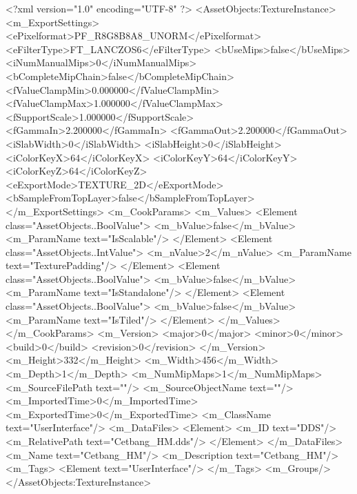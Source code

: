 <?xml version="1.0" encoding="UTF-8" ?>
<AssetObjects:TextureInstance>
    <m_ExportSettings>
        <ePixelformat>PF_R8G8B8A8_UNORM</ePixelformat>
        <eFilterType>FT_LANCZOS6</eFilterType>
        <bUseMips>false</bUseMips>
        <iNumManualMips>0</iNumManualMips>
        <bCompleteMipChain>false</bCompleteMipChain>
        <fValueClampMin>0.000000</fValueClampMin>
        <fValueClampMax>1.000000</fValueClampMax>
        <fSupportScale>1.000000</fSupportScale>
        <fGammaIn>2.200000</fGammaIn>
        <fGammaOut>2.200000</fGammaOut>
        <iSlabWidth>0</iSlabWidth>
        <iSlabHeight>0</iSlabHeight>
        <iColorKeyX>64</iColorKeyX>
        <iColorKeyY>64</iColorKeyY>
        <iColorKeyZ>64</iColorKeyZ>
        <eExportMode>TEXTURE_2D</eExportMode>
        <bSampleFromTopLayer>false</bSampleFromTopLayer>
    </m_ExportSettings>
    <m_CookParams>
        <m_Values>
            <Element class="AssetObjects..BoolValue">
                <m_bValue>false</m_bValue>
                <m_ParamName text="IsScalable"/>
            </Element>
            <Element class="AssetObjects..IntValue">
                <m_nValue>2</m_nValue>
                <m_ParamName text="TexturePadding"/>
            </Element>
            <Element class="AssetObjects..BoolValue">
                <m_bValue>false</m_bValue>
                <m_ParamName text="IsStandalone"/>
            </Element>
            <Element class="AssetObjects..BoolValue">
                <m_bValue>false</m_bValue>
                <m_ParamName text="IsTiled"/>
            </Element>
        </m_Values>
    </m_CookParams>
    <m_Version>
        <major>0</major>
        <minor>0</minor>
        <build>0</build>
        <revision>0</revision>
    </m_Version>
    <m_Height>332</m_Height>
    <m_Width>456</m_Width>
    <m_Depth>1</m_Depth>
    <m_NumMipMaps>1</m_NumMipMaps>
    <m_SourceFilePath text=""/>
    <m_SourceObjectName text=""/>
    <m_ImportedTime>0</m_ImportedTime>
    <m_ExportedTime>0</m_ExportedTime>
    <m_ClassName text="UserInterface"/>
    <m_DataFiles>
        <Element>
            <m_ID text="DDS"/>
            <m_RelativePath text="Cetbang_HM.dds"/>
        </Element>
    </m_DataFiles>
    <m_Name text="Cetbang_HM"/>
    <m_Description text="Cetbang_HM"/>
    <m_Tags>
        <Element text="UserInterface"/>
    </m_Tags>
    <m_Groups/>
</AssetObjects:TextureInstance>
